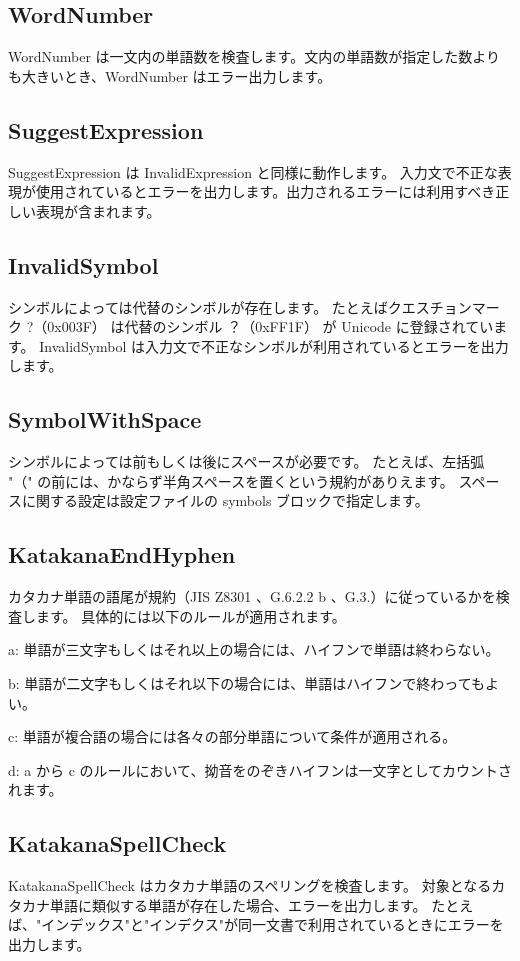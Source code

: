 \subsection{WordNumber}
WordNumber は一文内の単語数を検査します。文内の単語数が指定した数よりも大きいとき、WordNumber はエラー出力します。
\subsection{SuggestExpression}
SuggestExpression は InvalidExpression と同様に動作します。 入力文で不正な表現が使用されているとエラーを出力します。出力されるエラーには利用すべき正しい表現が含まれます。
\subsection{InvalidSymbol}
シンボルによっては代替のシンボルが存在します。 たとえばクエスチョンマーク ?（0x003F） は代替のシンボル ？（0xFF1F） が Unicode に登録されています。 InvalidSymbol は入力文で不正なシンボルが利用されているとエラーを出力します。


\subsection{SymbolWithSpace}
シンボルによっては前もしくは後にスペースが必要です。 たとえば、左括弧 "（" の前には、かならず半角スペースを置くという規約がありえます。 スペースに関する設定は設定ファイルの symbols ブロックで指定します。
\subsection{KatakanaEndHyphen}
カタカナ単語の語尾が規約（JIS Z8301 、G.6.2.2 b 、G.3.）に従っているかを検査します。 具体的には以下のルールが適用されます。

a: 単語が三文字もしくはそれ以上の場合には、ハイフンで単語は終わらない。

b: 単語が二文字もしくはそれ以下の場合には、単語はハイフンで終わってもよい。

c: 単語が複合語の場合には各々の部分単語について条件が適用される。

d: a から c のルールにおいて、拗音をのぞきハイフンは一文字としてカウントされます。
\subsection{KatakanaSpellCheck}
KatakanaSpellCheck はカタカナ単語のスペリングを検査します。 対象となるカタカナ単語に類似する単語が存在した場合、エラーを出力します。 たとえば、"インデックス"と"インデクス"が同一文書で利用されているときにエラーを出力します。
